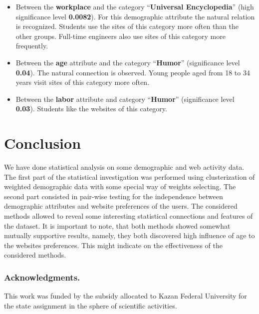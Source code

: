 \documentclass[runningheads,a4paper]{llncs}
\begin{document}
\begin{itemize}
	\item Between the \textbf{workplace} and the category ``\textbf{Universal Encyclopedia}'' (high significance level \textbf{0.0082}). For this demographic attribute the natural relation is recognized. Students use the sites of this category more often than the other groups. Full-time engineers also use sites of this category more frequently.
	\item Between the \textbf{age} attribute and the category ``\textbf{Humor}'' (significance level \textbf{0.04}). The natural connection is observed. Young people aged from 18 to 34 years visit sites of this category more often.
	\item Between the \textbf{labor} attribute and category ``\textbf{Humor}'' (significance level \textbf{0.03}). Students like the websites of this category.
\end{itemize}


\section{Conclusion}


We have done statistical analysis on some demographic and web activity data. The first part of the statistical investigation was performed using clusterization of weighted demographic data with some special way of weights selecting. The second part consisted in pair-wise testing for the independence between demographic attributes and website preferences of the users. The considered methods allowed to reveal some interesting statistical connections and features of the dataset. It is important to note, that both methods showed somewhat mutually supportive results, namely, they both discovered high influence of age to the websites preferences. This might indicate on the effectiveness of the considered methods.


\subsubsection*{Acknowledgments.} This work was funded by the subsidy allocated to Kazan Federal University for the state assignment in the sphere of scientific activities. 
\end{document}
